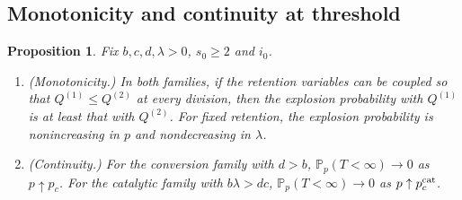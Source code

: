 \documentclass[11pt,a4paper]{article}
\numberwithin{equation}{section}
\newtheorem{proposition}[theorem]{Proposition}
\theoremstyle{definition}\newtheorem{definition}[theorem]{Definition}
\theoremstyle{remark}\newtheorem{remark}[theorem]{Remark}\newtheorem{example}[theorem]{Example}
\renewcommand{\P}{\mathbb P}
\begin{document}
\subsection{Monotonicity and continuity at threshold}
\begin{proposition}\label{prop:continuity}
Fix $b,c,d,\lambda>0$, $s_0\ge2$ and $i_0$.
\begin{enumerate}[label=(\alph*)]
\item (Monotonicity.) In both families, if the retention variables can be coupled so that $Q^{(1)}\le Q^{(2)}$ at every division, then the explosion probability with $Q^{(1)}$ is at least that with $Q^{(2)}$. For fixed retention, the explosion probability is nonincreasing in $p$ and nondecreasing in $\lambda$.
\item (Continuity.) For the conversion family with $d>b$, $\P_p(T<\infty)\to0$ as $p\uparrow p_c$. For the catalytic family with $b\lambda>dc$, $\P_p(T<\infty)\to0$ as $p\uparrow p^{\rm cat}_c$.
\end{enumerate}
\end{proposition}
\end{document}
